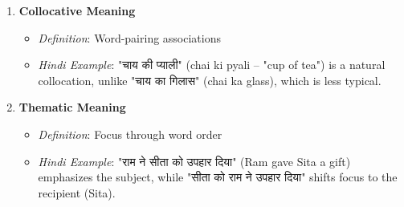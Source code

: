 \documentclass{article}
\begin{document}
\begin{enumerate}[leftmargin=*]
		\item \textbf{Collocative Meaning}
		\begin{itemize}
			\item \textit{Definition}: Word-pairing associations
			\item \textit{Hindi Example}: "चाय की प्याली" (chai ki pyali – "cup of tea") is a natural collocation, unlike "चाय का गिलास" (chai ka glass), which is less typical.
		\end{itemize}
		
		\item \textbf{Thematic Meaning}
		\begin{itemize}
			\item \textit{Definition}: Focus through word order
			\item \textit{Hindi Example}:  "राम ने सीता को उपहार दिया" (Ram gave Sita a gift) emphasizes the subject, while "सीता को राम ने उपहार दिया" shifts focus to the recipient (Sita).
		\end{itemize}
	\end{enumerate}
	
\end{document}
